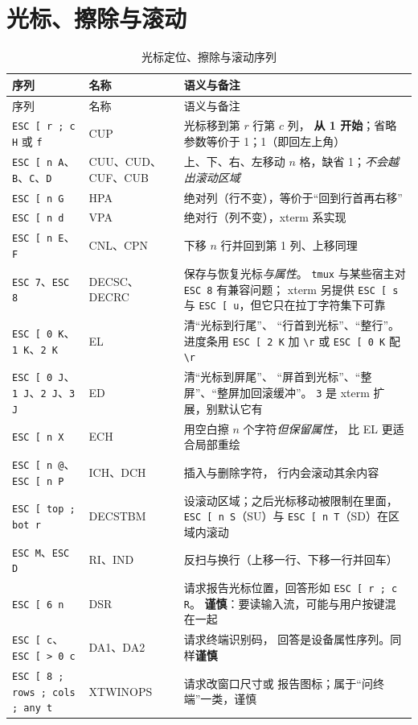 \documentclass[12pt,a4paper,fontset=fandol]{ctexbook}
\newcommand{\Tp}[1]{\texttt{#1}}
\begin{document}
\section{光标、擦除与滚动}

\begin{longtable}{@{}>{\raggedright\arraybackslash}p{}
                 >{\raggedright\arraybackslash}p{}
                 >{\raggedright\arraybackslash}p{}@{}}
\caption{光标定位、擦除与滚动序列}
\label{tab:cursor} \\
\toprule
序列 & 名称 & 语义与备注 \\
\midrule
\endfirsthead
\toprule
序列 & 名称 & 语义与备注 \\
\midrule
\endhead
\Tp{ESC [ r ; c H} 或 \Tp{f} & CUP & 光标移到第 \(r\) 行第 \(c\) 列，
\textbf{从 1 开始}；省略参数等价于 1；1（即回左上角） \\
\Tp{ESC [ n A}、\Tp{B}、\Tp{C}、\Tp{D} & CUU、CUD、CUF、CUB &
上、下、右、左移动 \(n\) 格，缺省 1；\emph{不会越出滚动区域} \\
\Tp{ESC [ n G} & HPA & 绝对列（行不变），等价于``回到行首再右移'' \\
\Tp{ESC [ n d} & VPA & 绝对行（列不变），xterm 系实现 \\
\Tp{ESC [ n E}、\Tp{F} & CNL、CPN & 下移 \(n\) 行并回到第 1 列、上移同理 \\
\Tp{ESC 7}、\Tp{ESC 8} & DECSC、DECRC & 保存与恢复光标\emph{与属性}。
\Tp{tmux} 与某些宿主对 \Tp{ESC 8} 有兼容问题；
xterm 另提供 \Tp{ESC [ s} 与 \Tp{ESC [ u}，但它只在拉丁字符集下可靠 \\
\Tp{ESC [ 0 K}、\Tp{1 K}、\Tp{2 K} & EL & 清``光标到行尾''、
``行首到光标''、``整行''。进度条用 \Tp{ESC [ 2 K} 加 \Tp{\textbackslash r}
或 \Tp{ESC [ 0 K} 配 \Tp{\textbackslash r} \\
\Tp{ESC [ 0 J}、\Tp{1 J}、\Tp{2 J}、\Tp{3 J} & ED & 清``光标到屏尾''、
``屏首到光标''、``整屏''、``整屏加回滚缓冲''。
\Tp{3} 是 xterm 扩展，别默认它有 \\
\Tp{ESC [ n X} & ECH & 用空白擦 \(n\) 个字符\emph{但保留属性}，
比 EL 更适合局部重绘 \\
\Tp{ESC [ n @}、\Tp{ESC [ n P} & ICH、DCH & 插入与删除字符，
行内会滚动其余内容 \\
\Tp{ESC [ top ; bot r} & DECSTBM & 设滚动区域；之后光标移动被限制在里面，
\Tp{ESC [ n S}（SU）与 \Tp{ESC [ n T}（SD）在区域内滚动 \\
\Tp{ESC M}、\Tp{ESC D} & RI、IND & 反扫与换行（上移一行、下移一行并回车） \\
\Tp{ESC [ 6 n} & DSR & 请求报告光标位置，回答形如 \Tp{ESC [ r ; c R}。
\textbf{谨慎}：要读输入流，可能与用户按键混在一起 \\
\Tp{ESC [ c}、\Tp{ESC [ > 0 c} & DA1、DA2 & 请求终端识别码，
回答是设备属性序列。同样\textbf{谨慎} \\
\Tp{ESC [ 8 ; rows ; cols ; any t} & XTWINOPS & 请求改窗口尺寸或
报告图标；属于``问终端''一类，谨慎 \\
\bottomrule
\end{longtable}
\end{document}
